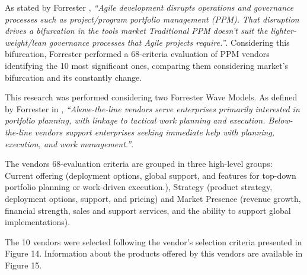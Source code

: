 As stated by Forrester \cite{forresterWavePPM}, \textit{``Agile development disrupts operations and governance processes such as project/program portfolio management (PPM). That disruption drives a bifurcation in the tools market \- Traditional PPM doesn't suit the lighter-weight/lean governance processes that Agile projects require.''}. Considering this bifurcation, Forrester performed a 68-criteria evaluation of PPM vendors identifying the 10 most significant ones, comparing them  considering market's bifurcation and its constantly change.\par
This research was performed considering two Forrester Wave Models. As defined by Forrester in \cite{forresterWavePPM}, \textit{``Above-the-line vendors serve enterprises primarily interested in portfolio planning, with linkage to tactical work planning and execution. Below-the-line vendors support enterprises seeking immediate help with planning, execution, and work management.''}.\par
The vendors 68-evaluation criteria are grouped in three high-level groups: Current offering (deployment options, global support, and features for top-down portfolio planning or work-driven execution.), Strategy (product strategy, deployment options, support, and pricing) and Market Presence (revenue growth, financial strength, sales and support services, and the ability to support global implementations).\par
The 10 vendors were selected following the vendor's selection criteria presented in Figure 14. Information about the products offered by this vendors are available in Figure 15.\par


